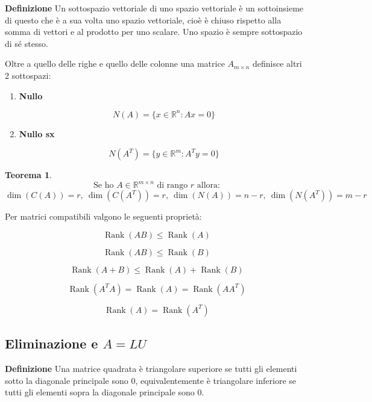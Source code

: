 \documentclass{article}
\newtheorem{theorem}{Teorema}
\newcommand{\df}{\noindent\textbf{Definizione} }
\begin{document}
\df Un sottospazio vettoriale di uno spazio vettoriale è un sottoinsieme di questo che è a sua volta uno spazio vettoriale, cioè è chiuso rispetto alla somma di vettori e al prodotto per uno scalare. Uno spazio è sempre sottospazio di sé stesso.\newline


Oltre a quello delle righe e quello delle colonne una matrice $A_{m\times n}$ definisce altri 2 sottospazi:
\begin{enumerate}
    \item \textbf{Nullo}

        \[
            N(A)
            =
            \{x\in\mathbb{R}^n:Ax=0\}
        \]
    
    \item \textbf{Nullo sx}

        \[
            N(A^T)
            =
            \{y\in\mathbb{R}^m:A^Ty=0\}
        \]\newline
    
\end{enumerate}

\begin{theorem}
    \[
        \text{Se ho }A\in\mathbb{R}^{m\times n}\text{ di rango $r$ allora:}
    \]
    \[
        \dim(C(A))=r,\
        \dim(C(A^T))=r,\
        \dim(N(A))=n-r,\
        \dim(N(A^T))=m-r
    \]\newline

\end{theorem}

Per matrici compatibili valgono le seguenti proprietà:

\[
\operatorname{Rank}(AB)
\le
\operatorname{Rank}(A)
\]

\[
\operatorname{Rank}(AB)
\le
\operatorname{Rank}(B)
\]

\[
\operatorname{Rank}(A+B)
\le
\operatorname{Rank}(A)+\operatorname{Rank}(B)
\]

\[
\operatorname{Rank}(A^TA)
=
\operatorname{Rank}(A)
=
\operatorname{Rank}(AA^T)
\]

\[
\operatorname{Rank}(A)
=
\operatorname{Rank}(A^T)
\]\newpage

\subsection{\texorpdfstring{Eliminazione e $A=LU$}{A=LU}}

\df Una matrice quadrata è triangolare superiore se tutti gli elementi sotto la diagonale principale sono 0, equivalentemente è triangolare inferiore se tutti gli elementi sopra la diagonale principale sono 0.\newline 
\end{document}
